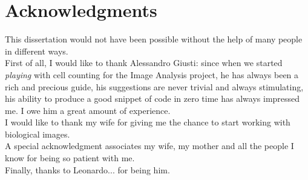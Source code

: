 \chapter*{Acknowledgments}


\vspace{1cm}

This dissertation would not have been possible without the help of many people in different ways.\\



First of all, I would like to thank Alessandro Giusti: since when we started \textit{playing}
with cell counting for the Image Analysis project, he has always been a rich and precious guide,
his suggestions are never trivial and always stimulating, his ability to produce a good snippet of code in zero time has always impressed me.
I owe him a great amount of experience.\\



I would like to thank my wife for giving me the chance to start working with biological images.\\



A special acknowledgment associates my wife, my mother and all the people I know for being so patient with me.\\




Finally, thanks to Leonardo... for being him.


